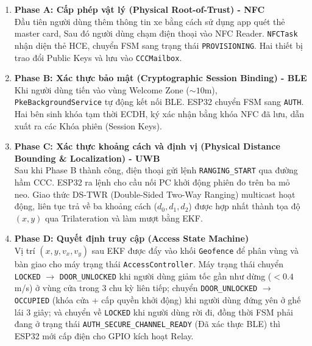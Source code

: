 \begin{enumerate}
    \item \textbf{Phase A: Cấp phép vật lý (Physical Root-of-Trust) - NFC} \\
    Đầu tiên người dùng thêm thông tin xe bằng cách sử dụng app quét thẻ master card, Sau đó người dùng chạm điện thoại vào NFC Reader. \texttt{NFCTask} nhận diện thẻ HCE, chuyển FSM sang trạng thái \texttt{PROVISIONING}. Hai thiết bị trao đổi Public Keys và lưu vào \texttt{CCCMailbox}.
    
    \item \textbf{Phase B: Xác thực bảo mật (Cryptographic Session Binding) - BLE} \\
    Khi người dùng tiến vào vùng Welcome Zone ($\sim 10$m), \texttt{PkeBackgroundService} tự động kết nối BLE. ESP32 chuyển FSM sang \texttt{AUTH}. Hai bên sinh khóa tạm thời ECDH, ký xác nhận bằng khóa NFC đã lưu, dẫn xuất ra các Khóa phiên (Session Keys).
    
    \item \textbf{Phase C: Xác thực khoảng cách và định vị (Physical Distance Bounding \& Localization) - UWB} \\
    Sau khi Phase B thành công, điện thoại gửi lệnh \texttt{RANGING\_START} qua đường hầm CCC. ESP32 ra lệnh cho cầu nối PC khởi động phiên đo trên ba mỏ neo. Giao thức DS-TWR (Double-Sided Two-Way Ranging) multicast hoạt động, liên tục trả về ba khoảng cách ($d_0, d_1, d_2$) được hợp nhất thành tọa độ $(x, y)$ qua Trilateration và làm mượt bằng EKF.
    
    \item \textbf{Phase D: Quyết định truy cập (Access State Machine)} \\
    Vị trí $(x, y, v_x, v_y)$ sau EKF được đẩy vào khối \texttt{Geofence} để phân vùng và bàn giao cho máy trạng thái \texttt{AccessController}. Máy trạng thái chuyển \texttt{LOCKED} $\rightarrow$ \texttt{DOOR\_UNLOCKED} khi người dùng giảm tốc gần như dừng ($<0.4$ m/s) ở vùng cửa trong 3 chu kỳ liên tiếp; chuyển \texttt{DOOR\_UNLOCKED} $\rightarrow$ \texttt{OCCUPIED} (khóa cửa + cấp quyền khởi động) khi người dùng đứng yên ở ghế lái 3 giây; và chuyển về \texttt{LOCKED} khi người dùng rời đi, đồng thời FSM phải đang ở trạng thái \texttt{AUTH\_SECURE\_CHANNEL\_READY} (Đã xác thực BLE) thì ESP32 mới cấp điện cho GPIO kích hoạt Relay.
\end{enumerate}







